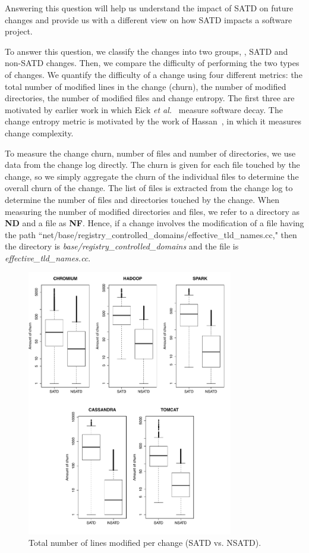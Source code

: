 Answering this question will help us understand the impact of SATD on future changes and provide us with a different view on how SATD impacts a software project.


  To answer this question, we classify the changes into two groups, \ie{}, SATD and non-SATD changes. Then, we compare the difficulty of performing the two types of changes. We quantify the difficulty of a change using four different metrics: the total number of modified lines in the change (churn), the number of modified directories, the number of modified files and change entropy. The first three are motivated by earlier work in which Eick \emph{et al.}~\cite{eick2001decay} measure software decay. The change entropy metric is motivated by the work of Hassan~\cite{hassan2009predicting}, in which it measures change complexity.



To measure the change churn, number of files and number of directories, we use data from the change log directly. The churn is given for each file touched by the change, so we simply aggregate the churn of the individual files to determine the overall churn of the change. The list of files is extracted from the change log to determine the number of files and directories touched by the change. When measuring the number of modified  directories and files, we refer to a directory as \textbf{ND} and  a file as \textbf{NF}. Hence, if a change involves the modification of a file having the path ``net/base/registry\_controlled\_domains/effective\_tld\_names.cc," then the directory is \textit{base/registry\_controlled\_domains} and the file is \textit{effective\_tld\_names.cc}.



\begin{figure}[!tb]
	\centering
	\includegraphics[width=90mm]{figures/chapter3/churn_for_all_projects}
	\caption{Total number of lines modified per change (SATD vs. NSATD).}
	\label{figure:tlcpc}
\end{figure}




